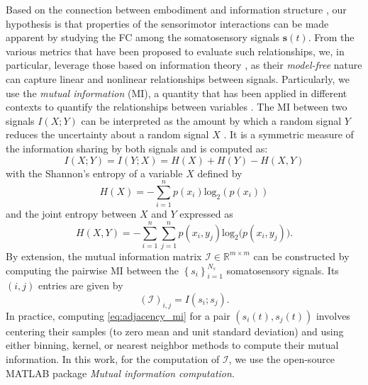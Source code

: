 Based on the connection between embodiment and information structure \cite{Pfeifer2007Selforganizationembodiment}, our hypothesis is that properties of the sensorimotor interactions can be made apparent by studying the FC among the somatosensory signals $ \bm{s}(t) $. From the various metrics that have been proposed to evaluate such relationships, we, in particular, leverage those based on information theory \cite{Bonsignorio2020EntropyBasedMetrics,Bonsignorio2013Quantifyingevolutionaryself}, as their \emph{model-free} nature can capture linear and nonlinear relationships between signals. Particularly, we use the \emph{mutual information} (MI), a quantity that has been applied in different contexts to quantify the relationships between variables \cite{Steuer2002mutualinformationdetecting}. The MI between two signals $ I\left(X;Y\right) $ can be interpreted as the amount by which a random signal $ Y $ reduces the uncertainty about a random signal $ X $ \cite{Cover1999Elementsinformationtheory}. It is a symmetric measure of the information sharing by both signals and is computed as:
\begin{equation}\label{eq:mutual_information}
	I\left(X;Y\right) =I\left(Y;X\right) = H(X) + H(Y) - H(X,Y)
\end{equation}
with the Shannon's entropy of a variable $X$ defined by 
\begin{equation}\label{eq:entropy}
	H(X) = -\sum_{i=1}^{n}p(x_i)\text{log}_2\left(p\left(x_i\right)\right)
\end{equation}
and the joint entropy between $ X $ and $ Y $ expressed as
\begin{equation}\label{eq:joint_entropy}
	H(X,Y) = -\sum_{i=1}^{n}\sum_{j=1}^{n} p(x_i,y_j)\text{log}_2\big(p\left(x_i,y_j\right)\big).
\end{equation}
By extension, the mutual information matrix $\bm{\mathcal{I}} \in \mathbb{R}^{m \times m}$ can be constructed by computing the pairwise MI between the $\left\lbrace s_i\right\rbrace^{N_s}_{i=1}$ somatosensory signals. Its $(i,j)$ entries are given by
\begin{equation}\label{eq:adjacency_mi}
	(\bm{\mathcal{I}})_{i,j} = I(s_i;s_j).
\end{equation}
In practice, computing \eqref{eq:adjacency_mi}  for a pair $\left({s}_i(t),{s}_j(t)\right)$ involves centering their samples (to zero mean and unit standard deviation) and using either binning, kernel, or nearest neighbor methods \cite{WaltersWilliams2009Estimationmutualinformation} to compute their mutual information. In this work, for the computation of $\bm{\mathcal{I}}$, we use the open-source MATLAB package \emph{Mutual information computation}\cite{PengMutualInformationcomputation}.

